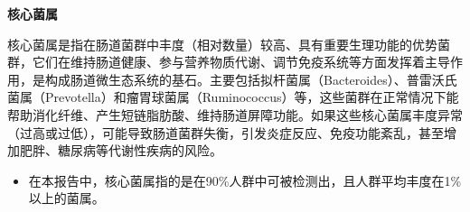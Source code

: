 \documentclass[UTF8]{ctexart}
\begin{document}
\begin{tcolorbox}[
    enhanced,
    colback=white,
    colframe=white,
    arc=2mm,
    boxrule=0pt,
    width=\textwidth,
    left=15pt,
    right=15pt,
    top=10pt,
    bottom=10pt,
    drop shadow={
        opacity=0.2,
        color=customTeal
    },
    borderline west={5pt}{0pt}{customTeal}
]
\textcolor{customTeal}{\large\textbf{核心菌属}}
\end{tcolorbox}
\vspace{0.05cm}
\begin{tcolorbox}[
    enhanced,
    colback=customTealBg,
    colframe=customTealBg,
    arc=3mm,
    boxrule=0pt,
    width=\textwidth,
    top=8pt,
    bottom=8pt
]
{\small{\color{customTeal}\faInfoCircle} 核心菌属是指在肠道菌群中丰度（相对数量）较高、具有重要生理功能的优势菌群，它们在维持肠道健康、参与营养物质代谢、调节免疫系统等方面发挥着主导作用，是构成肠道微生态系统的基石。主要包括拟杆菌属（Bacteroides）、普雷沃氏菌属（Prevotella）和瘤胃球菌属（Ruminococcus）等，这些菌群在正常情况下能帮助消化纤维、产生短链脂肪酸、维持肠道屏障功能。如果这些核心菌属丰度异常（过高或过低），可能导致肠道菌群失衡，引发炎症反应、免疫功能紊乱，甚至增加肥胖、糖尿病等代谢性疾病的风险。
\begin{itemize}
    \item 在本报告中，核心菌属指的是在90\%人群中可被检测出，且人群平均丰度在1\%以上的菌属。
\end{itemize}
}
\end{tcolorbox}
\vspace{-0.5cm}
\end{document}
